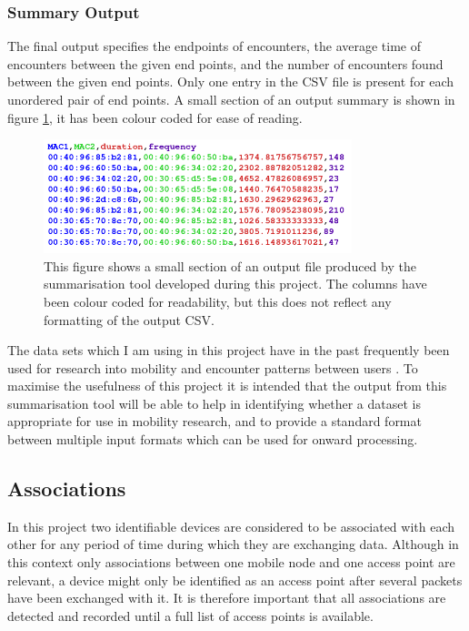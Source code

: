\subsubsection{Summary Output}
The final output specifies the endpoints of encounters, the average time of encounters between the given end points, and the number of encounters found between the given end points. Only one entry in the CSV file is present for each unordered pair of end points. A small section of an output summary is shown in figure \ref{fig:output}, it has been colour coded for ease of reading.\newline
\begin{figure}[h]
    \centering
    \includegraphics[width=0.8\textwidth]{Output_Example_Coloured.png}
    \caption{This figure shows a small section of an output file produced by the summarisation tool developed during this project. The columns have been colour coded for readability, but this does not reflect any formatting of the output CSV.}
    \label{fig:output}
\end{figure}

The data sets which I am using in this project have in the past frequently been used for research into mobility and encounter patterns between users \cite{Scellato2011} \cite{Xiao2014} \cite{Hsu2010} \cite{Musolesi2009} \cite{Kosta2014} \cite{Kumar2009} \cite{Wei2013}. To maximise the usefulness of this project it is intended that the output from this  summarisation tool will be able to help in identifying whether a dataset is appropriate for use in mobility research, and to provide a standard format between multiple input formats which can be used for onward processing.

\subsection{Associations} 
In this project two identifiable devices are considered to be associated with each other for any period of time during which they are exchanging data. Although in this context only associations between one mobile node and one access point are relevant, a device might only be identified as an access point after several packets have been exchanged with it. It is therefore important that all associations are detected and recorded until a full list of access points is available.
